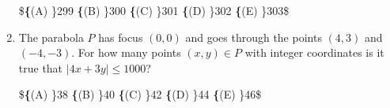 \documentclass{article}
\begin{document}
\begin{enumerate}[label=\arabic*., itemsep=0.5em]
\$\textbf\{(A) \}299\qquad
\textbf\{(B) \}300\qquad
\textbf\{(C) \}301\qquad
\textbf\{(D) \}302\qquad
\textbf\{(E) \}303\qquad\$\par \vspace{0.5em}\item The parabola $P$ has focus $(0,0)$ and goes through the points $(4,3)$ and $(-4,-3)$.  For how many points $(x,y)\in P$ with integer coordinates is it true that $|4x+3y|\leq 1000$?

\$\textbf\{(A) \}38\qquad
\textbf\{(B) \}40\qquad
\textbf\{(C) \}42\qquad
\textbf\{(D) \}44\qquad
\textbf\{(E) \}46\qquad\$\par \vspace{0.5em}\end{enumerate}
\end{document}
